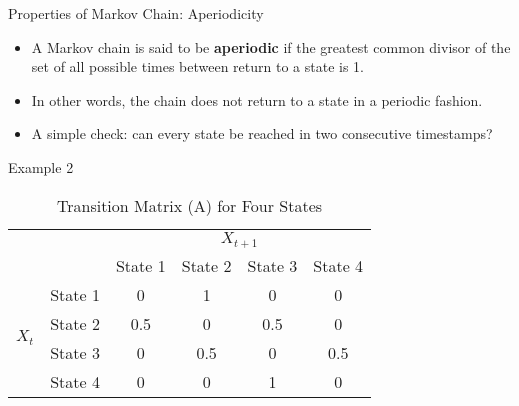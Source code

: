 \documentclass{beamer}
\begin{document}
  \begin{frame}{Properties of Markov Chain: Aperiodicity}
    \begin{itemize}
        \item A Markov chain is said to be \textbf{aperiodic} if the greatest common divisor of the set of all possible times between return to a state is 1.
        \pause \item In other words, the chain does not return to a state in a periodic fashion.
        \pause \item A simple check: can every state be reached in two consecutive timestamps?
        
    \end{itemize}

    \pause Example 2

    \begin{table}[h]
      \centering
      \caption{Transition Matrix (A) for Four States}
      \small %
      \begin{tabular}{cccccc}
        \toprule
        & & \multicolumn{4}{c}{\(X_{t+1}\)} \\
        \cmidrule{3-6}
        & & State 1 & State 2 & State 3 & State 4 \\
        \midrule
        \multirow{4}{*}{\(X_t\)} & State 1 & 0 & 1 & 0 & 0 \\
        & State 2 & 0.5 & 0 & 0.5 & 0 \\
        & State 3 & 0 & 0.5 & 0 & 0.5 \\
        & State 4 & 0 & 0 & 1 & 0 \\
        \bottomrule
      \end{tabular}
    \end{table}

  
\end{frame}




\begin{frame}

\end{frame}
\end{document}
